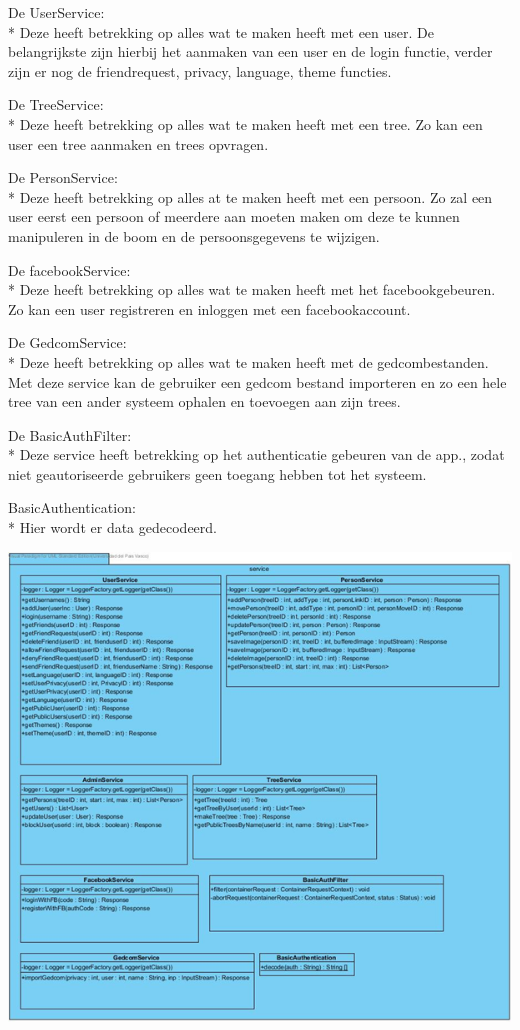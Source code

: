\documentclass[pdftex,a4paper,12pt,twoside]{report}
\begin{document}
De UserService:\\*
Deze heeft betrekking op alles wat te maken heeft met een user.
De belangrijkste zijn hierbij het aanmaken van een user en de login functie, verder zijn er nog de friendrequest, privacy, language, theme functies.

De TreeService:\\*
Deze heeft betrekking op alles wat te maken heeft met een tree.
Zo kan een user een tree aanmaken en trees opvragen.

De PersonService:\\*
Deze heeft betrekking op alles at te maken heeft met een persoon.
Zo zal een user eerst een persoon of meerdere aan moeten maken om deze te kunnen manipuleren in de boom en de persoonsgegevens te wijzigen.

De facebookService:\\*
Deze heeft betrekking op alles wat te maken heeft met het facebookgebeuren.
Zo kan een user registreren en inloggen met een facebookaccount.

De GedcomService:\\*
Deze heeft betrekking op alles wat te maken heeft met de gedcombestanden.
Met deze service kan de gebruiker een gedcom bestand importeren en zo een hele tree van een ander systeem ophalen en toevoegen aan zijn trees.

De BasicAuthFilter:\\*
Deze service heeft betrekking op het authenticatie gebeuren van de app., zodat niet geautoriseerde gebruikers geen toegang hebben tot het systeem.

BasicAuthentication:\\*
Hier wordt er data gedecodeerd.

\includegraphics[width=\textwidth]{images/DCDService.png}\\
\end{document}

